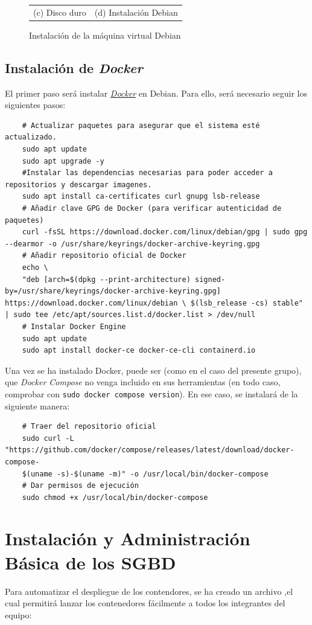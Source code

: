 \documentclass{article}
\begin{document}
\begin{center}
\begin{figure}[H]
\begin{tabular}{c c}
        (c) Disco duro & (d) Instalación Debian
        \end{tabular}
        \caption{Instalación de la máquina virtual Debian}
        \label{fig:instalación máquina virtual}
    \end{figure}
\end{center}


\subsection{Instalación de \textit{Docker}}\label{subsec:Instalación de Docker}
El primer paso será instalar \textit{\textcolor{blue}{\href{https://www.docker.com/}{Docker}}} en Debian. Para ello, será necesario seguir los siguientes pasos:

\begin{lstlisting}
    # Actualizar paquetes para asegurar que el sistema esté actualizado.
    sudo apt update
    sudo apt upgrade -y
    #Instalar las dependencias necesarias para poder acceder a repositorios y descargar imagenes.
    sudo apt install ca-certificates curl gnupg lsb-release
    # Añadir clave GPG de Docker (para verificar autenticidad de paquetes)
    curl -fsSL https://download.docker.com/linux/debian/gpg | sudo gpg --dearmor -o /usr/share/keyrings/docker-archive-keyring.gpg
    # Añadir repositorio oficial de Docker
    echo \
    "deb [arch=$(dpkg --print-architecture) signed-by=/usr/share/keyrings/docker-archive-keyring.gpg] https://download.docker.com/linux/debian \ $(lsb_release -cs) stable" | sudo tee /etc/apt/sources.list.d/docker.list > /dev/null
    # Instalar Docker Engine
    sudo apt update
    sudo apt install docker-ce docker-ce-cli containerd.io
\end{lstlisting}

Una vez se ha instalado Docker, puede ser (como en el caso del presente grupo), que \textit{Docker Compose} no venga incluido en sus herramientas (en todo caso, comprobar con \texttt{sudo docker compose version}). En ese caso, se instalará de la siguiente manera: 
\begin{lstlisting}
    # Traer del repositorio oficial
    sudo curl -L "https://github.com/docker/compose/releases/latest/download/docker-compose-
    $(uname -s)-$(uname -m)" -o /usr/local/bin/docker-compose
    # Dar permisos de ejecución
    sudo chmod +x /usr/local/bin/docker-compose
\end{lstlisting}
\newpage

\section{Instalación y Administración Básica de los SGBD}
Para automatizar el despliegue de los contendores, se ha creado un archivo ,el cual permitirá lanzar los contenedores fácilmente a todos los integrantes del equipo:
\end{document}
